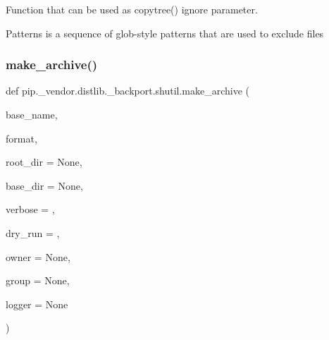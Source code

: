 \begin{DoxyVerb}Function that can be used as copytree() ignore parameter.

Patterns is a sequence of glob-style patterns
that are used to exclude files\end{DoxyVerb}
 \mbox{\label{namespacepip_1_1__vendor_1_1distlib_1_1__backport_1_1shutil_afbd5c41aeb3398006126295674e2ba62}} 
\subsubsection{\texorpdfstring{make\+\_\+archive()}{make\_archive()}}
{\footnotesize\ttfamily def pip.\+\_\+vendor.\+distlib.\+\_\+backport.\+shutil.\+make\+\_\+archive (\begin{DoxyParamCaption}\item[{}]{base\+\_\+name,  }\item[{}]{format,  }\item[{}]{root\+\_\+dir = {\ttfamily None},  }\item[{}]{base\+\_\+dir = {\ttfamily None},  }\item[{}]{verbose = {},  }\item[{}]{dry\+\_\+run = {},  }\item[{}]{owner = {\ttfamily None},  }\item[{}]{group = {\ttfamily None},  }\item[{}]{logger = {\ttfamily None} }\end{DoxyParamCaption})}

